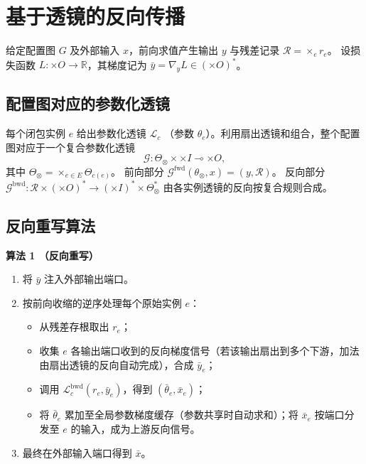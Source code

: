 \documentclass{ctexart}
\newcommand{\bigtimes}{\times}
\newcommand{\lensarrow}{\multimap}
\begin{document}
\section{基于透镜的反向传播}

给定配置图 $G$ 及外部输入 $x$，前向求值产生输出 $y$ 与残差记录 $\mathcal{R} = \bigtimes_e r_e$。  
设损失函数 $L: \bigtimes O \to \mathbb{R}$，其梯度记为 $\bar{y} = \nabla_y L \in (\bigtimes O)^*$。

\subsection{配置图对应的参数化透镜}

每个闭包实例 $e$ 给出参数化透镜 $\mathcal{L}_c$ （参数 $\theta_e$）。利用扇出透镜和组合，整个配置图对应于一个复合参数化透镜
\[
\mathcal{G} : \Theta_\otimes \times \bigtimes I \lensarrow \bigtimes O,
\]
其中 $\Theta_\otimes = \bigtimes_{e\in E} \Theta_{c(e)}$。  
前向部分 $\mathcal{G}^{\mathrm{fwd}}(\theta_\otimes, x) = (y, \mathcal{R})$。  
反向部分 $\mathcal{G}^{\mathrm{bwd}} : \mathcal{R} \times (\bigtimes O)^* \to (\bigtimes I)^* \times \Theta_\otimes^*$ 由各实例透镜的反向按复合规则合成。

\subsection{反向重写算法}

\noindent\textbf{算法 1 （反向重写）}
\begin{enumerate}
    \item 将 $\bar{y}$ 注入外部输出端口。
    \item 按前向收缩的逆序处理每个原始实例 $e$：
    \begin{itemize}
        \item 从残差存根取出 $r_e$；
        \item 收集 $e$ 各输出端口收到的反向梯度信号（若该输出扇出到多个下游，加法由扇出透镜的反向自动完成），合成 $\bar{y}_e$；
        \item 调用 $\mathcal{L}_c^{\mathrm{bwd}}(r_e, \bar{y}_e)$，得到 $(\bar{\theta}_e, \bar{x}_e)$；
        \item 将 $\bar{\theta}_e$ 累加至全局参数梯度缓存（参数共享时自动求和）；将 $\bar{x}_e$ 按端口分发至 $e$ 的输入，成为上游反向信号。
    \end{itemize}
    \item 最终在外部输入端口得到 $\bar{x}$。
\end{enumerate}
\end{document}
